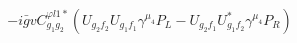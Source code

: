 %
\begin{dmath*}
%
  -  i {\bar g}{} vC^{ \varphi  l1*}_{g_1 g_2} \left(U_{g_2 f_2} U_{g_1 f_1} \gamma^{\mu_4} P_L - U_{g_2 f_1} U_{g_1 f_2}^* \gamma^{\mu_4} P_R\right)
%
\end{dmath*}
%
